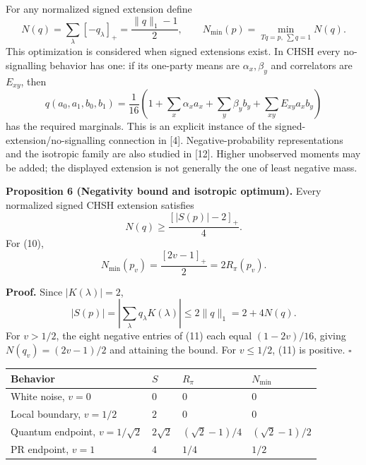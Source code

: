 \documentclass[
]{article}
\begin{document}
For any normalized signed extension define
\[
N(q)=\sum_\lambda[-q_\lambda]_+
=\frac{\|q\|_1-1}{2},\qquad
N_{\min}(p)=\min_{Tq=p,\ \sum q=1}N(q).
\]
This optimization is considered when signed extensions exist. In CHSH every no-signalling behavior has one: if its one-party means are \(\alpha_x,\beta_y\) and correlators are \(E_{xy}\), then
\[
q(a_0,a_1,b_0,b_1)=\frac1{16}
\left(1+\sum_x\alpha_x a_x+\sum_y\beta_y b_y
                  +\sum_{xy}E_{xy}a_xb_y\right)
\tag{13}
\]
has the required marginals. This is an explicit instance of the signed-extension/no-signalling connection in {[}4{]}. Negative-probability representations and the isotropic family are also studied in {[}12{]}. Higher unobserved moments may be added; the displayed extension is not generally the one of least negative mass.

\textbf{Proposition 6 (Negativity bound and isotropic optimum).} Every normalized signed CHSH extension satisfies
\[
N(q)\ge\frac{[|S(p)|-2]_+}{4}.
\]
For (10),
\[
N_{\min}(p_v)=\frac{[2v-1]_+}{2}=2R_\pi(p_v).
\tag{14}
\]

\textbf{Proof.} Since \(|K(\lambda)|=2\),
\[
|S(p)|=\left|\sum_\lambda q_\lambda K(\lambda)\right|
\le2\|q\|_1=2+4N(q).
\]
For \(v>1/2\), the eight negative entries of (11) each equal \((1-2v)/16\), giving \(N(q_v)=(2v-1)/2\) and attaining the bound. For \(v\le1/2\), (11) is positive. \(\square\)

\begin{longtable}[]{@{}
  >{\raggedright\arraybackslash}p{}
  >{\raggedleft\arraybackslash}p{}
  >{\raggedleft\arraybackslash}p{}
  >{\raggedleft\arraybackslash}p{}@{}}
\toprule\noalign{}
\begin{minipage}[b]{\linewidth}\raggedright
Behavior
\end{minipage} & \begin{minipage}[b]{\linewidth}\raggedleft
\(S\)
\end{minipage} & \begin{minipage}[b]{\linewidth}\raggedleft
\(R_\pi\)
\end{minipage} & \begin{minipage}[b]{\linewidth}\raggedleft
\(N_{\min}\)
\end{minipage} \\
\midrule\noalign{}
\endhead
\bottomrule\noalign{}
\endlastfoot
White noise, \(v=0\) & \(0\) & \(0\) & \(0\) \\
Local boundary, \(v=1/2\) & \(2\) & \(0\) & \(0\) \\
Quantum endpoint, \(v=1/\sqrt2\) & \(2\sqrt2\) & \((\sqrt2-1)/4\) & \((\sqrt2-1)/2\) \\
PR endpoint, \(v=1\) & \(4\) & \(1/4\) & \(1/2\) \\
\end{longtable}
\end{document}
